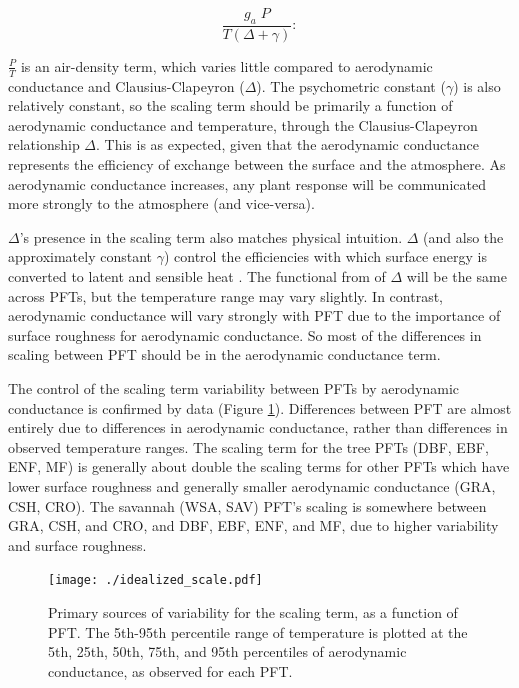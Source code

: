 \documentclass[draft,linenumbers]{agujournal}
\begin{document}
\begin{equation}
  \frac{g_a \; P}{T(\Delta + \gamma)}:
\end{equation}

$\frac{P}{T}$ is an air-density term, which varies little compared to
aerodynamic conductance and Clausius-Clapeyron ($\Delta$). The
psychometric constant ($\gamma$) is also relatively constant, so the
scaling term should be primarily a function of aerodynamic conductance
and temperature, through the Clausius-Clapeyron relationship
$\Delta$. This is as expected, given that the aerodynamic conductance
represents the efficiency of exchange between the surface and the
atmosphere. As aerodynamic conductance increases, any plant response
will be communicated more strongly to the atmosphere (and vice-versa).

$\Delta$'s presence in the scaling term also matches physical
intuition. $\Delta$ (and also the approximately constant $\gamma$)
control the efficiencies with which surface energy is converted to
latent and sensible heat \citep{Monteith_1965}. The functional from of
$\Delta$ will be the same across PFTs, but the temperature range may
vary slightly. In contrast, aerodynamic conductance will vary strongly
with PFT due to the importance of surface roughness for aerodynamic
conductance. So most of the differences in scaling between PFT should
be in the aerodynamic conductance term.

The control of the scaling term variability between PFTs by
aerodynamic conductance is confirmed by data (Figure
\ref{scale_vary}). Differences between PFT are almost entirely due to
differences in aerodynamic conductance, rather than differences in
observed temperature ranges. The scaling term for the tree PFTs (DBF,
EBF, ENF, MF) is generally about double the scaling terms for other
PFTs which have lower surface roughness and generally smaller
aerodynamic conductance (GRA, CSH, CRO). The savannah (WSA, SAV) PFT's
scaling is somewhere between GRA, CSH, and CRO, and DBF, EBF, ENF, and
MF, due to higher variability and surface roughness.

\begin{figure}
  \centerline{\texttt{[image: ./idealized\_scale.pdf]}}
  \caption{Primary sources of variability for the scaling term, as a
    function of PFT. The 5th-95th percentile range of temperature is
    plotted at the 5th, 25th, 50th, 75th, and 95th percentiles of
    aerodynamic conductance, as observed for each PFT.}
  \label{scale_vary}
\end{figure}
\end{document}
